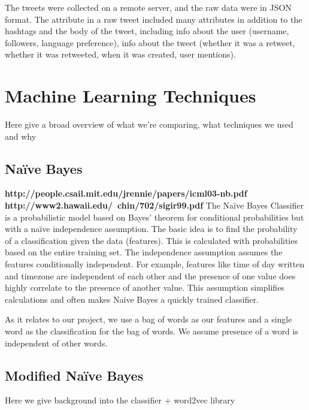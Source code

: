 \documentclass[11pt,letterpaper]{article}
\begin{document}
The tweets were collected on a remote server, and the raw data were in JSON format. The attribute in a raw tweet included many attributes in addition to the hashtags and the body of the tweet, including info about the user (username, followers, language preference), info about the tweet (whether it was a retweet, whether it was retweeted, when it was created, user mentions).

\section{Machine Learning Techniques}
Here give a broad overview of what we're comparing, what techniques we used and why

\subsection{Na{\"i}ve Bayes}
\textbf{http://people.csail.mit.edu/jrennie/papers/icml03-nb.pdf} \textbf{http://www2.hawaii.edu/~chin/702/sigir99.pdf}
  The Na{\"i}ve Bayes Classifier is a probabilistic model based on Bayes' theorem for conditional probabilities but with a na{\"i}ve independence assumption. The basic idea is to find the probability of a classification given the data  (features). This is calculated with probabilities based on the entire training set. The independence assumption assumes the features conditionally independent. For example, features like time of day written and timezone are independent of each other and the presence of one value does highly correlate to the presence of another value. This assumption simplifies calculations and often makes Na{\"i}ve Bayes a quickly trained classifier.

As it relates to our project, we use a bag of words as our features and a single word as the classification for the bag of words. We assume presence of a word is independent of other words. 


\subsection{Modified Na{\"i}ve Bayes}
Here we give background into the classifier + word2vec library
\end{document}
